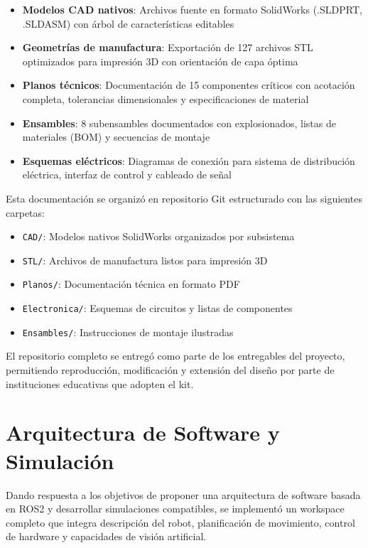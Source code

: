 \begin{itemize}
    \item \textbf{Modelos CAD nativos}: Archivos fuente en formato SolidWorks (.SLDPRT, .SLDASM) con árbol de características editables
    \item \textbf{Geometrías de manufactura}: Exportación de 127 archivos STL optimizados para impresión 3D con orientación de capa óptima
    \item \textbf{Planos técnicos}: Documentación de 15 componentes críticos con acotación completa, tolerancias dimensionales y especificaciones de material
    \item \textbf{Ensambles}: 8 subensambles documentados con explosionados, listas de materiales (BOM) y secuencias de montaje
    \item \textbf{Esquemas eléctricos}: Diagramas de conexión para sistema de distribución eléctrica, interfaz de control y cableado de señal
\end{itemize}

Esta documentación se organizó en repositorio Git estructurado con las siguientes carpetas:

\begin{itemize}
    \item \texttt{CAD/}: Modelos nativos SolidWorks organizados por subsistema
    \item \texttt{STL/}: Archivos de manufactura listos para impresión 3D
    \item \texttt{Planos/}: Documentación técnica en formato PDF
    \item \texttt{Electronica/}: Esquemas de circuitos y listas de componentes
    \item \texttt{Ensambles/}: Instrucciones de montaje ilustradas
\end{itemize}

El repositorio completo se entregó como parte de los entregables del proyecto, permitiendo reproducción, modificación y extensión del diseño por parte de instituciones educativas que adopten el kit.

\section{Arquitectura de Software y Simulación}

Dando respuesta a los objetivos de proponer una arquitectura de software basada en ROS2 y desarrollar simulaciones compatibles, se implementó un workspace completo que integra descripción del robot, planificación de movimiento, control de hardware y capacidades de visión artificial.

